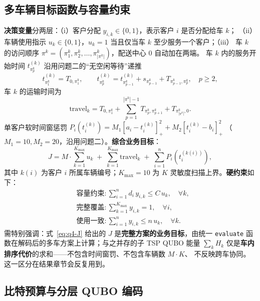 \documentclass[UTF8,12pt,a4paper]{ctexart}
\begin{document}
\subsection{多车辆目标函数与容量约束}
\label{subsec:q4-model}

\textbf{决策变量}分两层：（i）客户分配 $y_{i,k}\in\{0,1\}$，表示客户 $i$ 是否分配给车 $k$；
（ii）车辆使用指示 $u_k\in\{0,1\}$，$u_k=1$ 当且仅当车 $k$ 至少服务一个客户；（iii）
车 $k$ 的访问顺序 $\pi^k=(\pi_1^k,\pi_2^k,\dots,\pi_{|\pi^k|}^k)$，配送中心 $0$ 自动加在两端。
车 $k$ 内的服务开始时间 $t_{\pi_p^k}^{(k)}$ 沿用问题二的``无空闲等待''递推
\begin{equation}
\label{eq:q4-time}
t_{\pi_1^k}^{(k)}=T_{0,\pi_1^k},\qquad
t_{\pi_p^k}^{(k)}=t_{\pi_{p-1}^k}^{(k)}+s_{\pi_{p-1}^k}+T_{\pi_{p-1}^k,\pi_p^k},\quad p\ge 2,
\end{equation}
车 $k$ 的运输时间为
\begin{equation}
\label{eq:q4-travel}
\mathrm{travel}_k=T_{0,\pi_1^k}+\sum_{p=1}^{|\pi^k|-1}T_{\pi_p^k,\pi_{p+1}^k}+T_{\pi_{|\pi^k|}^k,0}.
\end{equation}
单客户软时间窗惩罚 $P_i(t_i^{(k)})=M_1[a_i-t_i^{(k)}]_+^2+M_2[t_i^{(k)}-b_i]_+^2$
（$M_1=10,M_2=20$，沿用问题二）。\textbf{综合业务目标}：
\begin{equation}
\label{eq:q4-J}
J=M\!\cdot\!\sum_{k=1}^{K_{\max}}u_k\;+\;\sum_{k=1}^{K_{\max}}\mathrm{travel}_k\;+\;\sum_{i=1}^{n}P_i(t_i^{(k(i))}),
\end{equation}
其中 $k(i)$ 为客户 $i$ 所属车辆编号；$K_{\max}=10$ 为 $K$ 灵敏度扫描上界。\textbf{硬约束}如下：
\begin{align}
\label{eq:q4-cap}
&\textbf{容量约束}: \sum_{i=1}^{n}d_i\,y_{i,k}\le C\,u_k,\quad \forall k,\\
\label{eq:q4-cover}
&\textbf{完整覆盖}: \sum_{k=1}^{K_{\max}}y_{i,k}=1,\quad \forall i,\\
\label{eq:q4-link}
&\textbf{使用一致}: \sum_{i=1}^{n}y_{i,k}\le n\,u_k,\quad \forall k.
\end{align}
需特别强调：式~\eqref{eq:q4-J} 给出的 $J$ 是\textbf{完整方案的业务目标}，由统一
\texttt{evaluate} 函数在解码后的多车方案上计算；与之并存的子 TSP QUBO 能量
$\sum_k H_k$ 仅是\textbf{车内排序代价}的求和——不包含时间窗罚、不包含车辆数 $M\!\cdot\!K$、
不反映跨车协同。这一区分在结果章节会反复用到。

\subsection{比特预算与分层 QUBO 编码}
\label{subsec:q4-budget}
\end{document}
